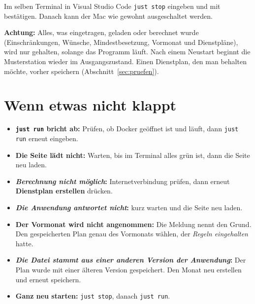 \documentclass[11pt]{combiArticle}
\newcommand{\code}[1]{\texttt{#1}}
\newcommand{\taste}[1]{\fbox{\small\strut #1}}
\newcommand{\knopf}[1]{\textbf{#1}}
\begin{document}
Im selben Terminal in Visual Studio Code \code{just stop} eingeben und mit \taste{Enter} bestätigen. Danach
kann der Mac wie gewohnt ausgeschaltet werden.

\textbf{Achtung:} Alles, was eingetragen, geladen oder berechnet wurde (Einschränkungen, Wünsche,
Mindestbesetzung, Vormonat und Dienstpläne), wird nur gehalten, solange das Programm läuft. Nach einem Neustart
beginnt die Musterstation wieder im Ausgangszustand. Einen Dienstplan, den man behalten möchte, vorher speichern
(Abschnitt~\ref{sec:pruefen}).

\section{Wenn etwas nicht klappt}

\begin{itemize}
  \item \textbf{\code{just run} bricht ab:} Prüfen, ob Docker geöffnet ist und läuft, dann \code{just run}
        erneut eingeben.
  \item \textbf{Die Seite lädt nicht:} Warten, bis im Terminal alles grün ist, dann die Seite neu laden.
  \item \textbf{\emph{Berechnung nicht möglich}:} Internetverbindung prüfen, dann erneut
        \knopf{Dienstplan erstellen} drücken.
  \item \textbf{\emph{Die Anwendung antwortet nicht}:} kurz warten und die Seite neu laden.
  \item \textbf{Der Vormonat wird nicht angenommen:} Die Meldung nennt den Grund. Den gespeicherten Plan genau des
        Vormonats wählen, der \emph{Regeln eingehalten} hatte.
  \item \textbf{\emph{Die Datei stammt aus einer anderen Version der Anwendung}:} Der Plan wurde mit einer älteren
        Version gespeichert. Den Monat neu erstellen und erneut speichern.
  \item \textbf{Ganz neu starten:} \code{just stop}, danach \code{just run}.
\end{itemize}
\end{document}
